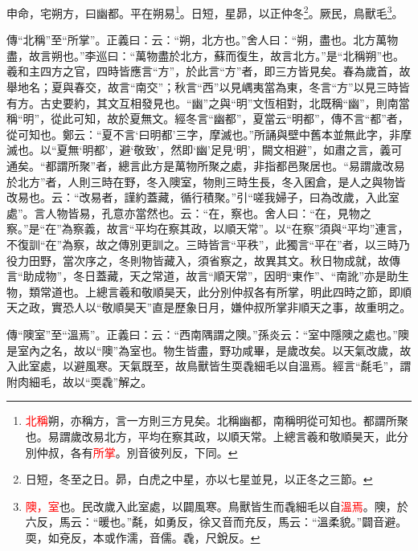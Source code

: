 申命，宅朔方，曰幽都。平在朔易\footnote{\textcolor{red}{北稱}朔，亦稱方，言一方則三方見矣。北稱幽都，南稱明從可知也。都謂所聚也。易謂歲改易北方，平均在察其政，以順天常。上總言羲和敬順昊天，此分別仲叔，各有\textcolor{red}{所掌}。別音彼列反，下同。}。日短，星昴，以正仲冬\footnote{日短，冬至之日。昴，白虎之中星，亦以七星並見，以正冬之三節。}。厥民，鳥獸毛\footnote{\textcolor{red}{隩，室}也。民改歲入此室處，以闢風寒。鳥獸皆生而毳細毛以自\textcolor{red}{溫焉}。隩，於六反，馬云：“暖也。”氄，如勇反，徐又音而充反，馬云：“溫柔貌。”闢音避。耎，如兗反，本或作濡，音儒。毳，尺銳反。}。

{\noindent\zhuan{}\fzbyks 傳“北稱”至“所掌”。正義曰：云：“朔，北方也。”舍人曰：“朔，盡也。北方萬物盡，故言朔也。”李巡曰：“萬物盡於北方，蘇而復生，故言北方。”是“北稱朔”也。羲和主四方之官，四時皆應言“方”，於此言“方”者，即三方皆見矣。春為歲首，故舉地名；夏與春交，故言“南交”；秋言“西”以見嵎夷當為東，冬言“方”以見三時皆有方。古史要約，其文互相發見也。“幽”之與“明”文恆相對，北既稱“幽”，則南當稱“明”，從此可知，故於夏無文。經冬言“幽都”，夏當云“明都”，傳不言“都”者，從可知也。鄭云：“夏不言‘曰明都’三字，摩滅也。”所誦與壁中舊本並無此字，非摩滅也。以“夏無‘明都’，避‘敬致’，然即‘幽’足見‘明’，闕文相避”，如肅之言，義可通矣。“都謂所聚”者，總言此方是萬物所聚之處，非指都邑聚居也。“易謂歲改易於北方”者，人則三時在野，冬入隩室，物則三時生長，冬入囷倉，是人之與物皆改易也。云：“改易者，謹約蓋藏，循行積聚。”引“嗟我婦子，曰為改歲，入此室處”。言人物皆易，孔意亦當然也。云：“在，察也。舍人曰：“在，見物之察。”是“在”為察義，故言“平均在察其政，以順天常”。以“在察”須與“平均”連言，不復訓“在”為察，故之傳別更訓之。三時皆言“平秩”，此獨言“平在”者，以三時乃役力田野，當次序之，冬則物皆藏入，須省察之，故異其文。秋日物成就，故傳言“助成物”，冬日蓋藏，天之常道，故言“順天常”，因明“東作”、“南訛”亦是助生物，類常道也。上總言羲和敬順昊天，此分別仲叔各有所掌，明此四時之節，即順天之政，實恐人以“敬順昊天”直是歷象日月，嫌仲叔所掌非順天之事，故重明之。 \par}

{\noindent\zhuan{}\fzbyks 傳“隩室”至“溫焉”。正義曰：云：“西南隅謂之隩。”孫炎云：“室中隱隩之處也。”隩是室內之名，故以“隩”為室也。物生皆盡，野功咸畢，是歲改矣。以天氣改歲，故入此室處，以避風寒。天氣既至，故鳥獸皆生耎毳細毛以自溫焉。經言“氄毛”，謂附肉細毛，故以“耎毳”解之。 \par}

